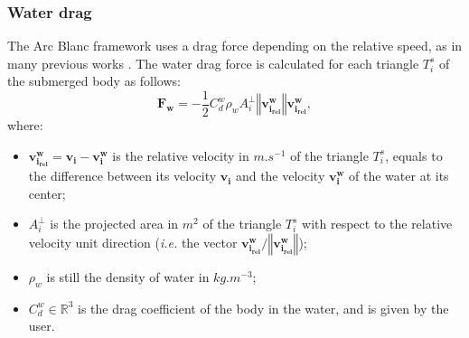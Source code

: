 \documentclass[final]{jcgt}
\def\Framework{The Arc Blanc framework\xspace}
\def\ie{\emph{i.e.}\xspace}
\begin{document}
\subsubsection{Water drag}
\label{subsubsec:waterDrag}
\Framework uses a drag force depending on the relative speed, as in many previous works \cite{yukselRealtimeWaterWaves2010,kellomakiRigidBodyInteraction2014,kernerWaterInteractionModel2016}.
The water drag force is calculated for each triangle $T_i^s$ of the submerged body as follows:
\begin{equation}
	\mathbf{F_w}= -\frac{1}{2} C_d^w \rho_w A_i^{\perp} \left\Vert\mathbf{v_{i_{rel}}^w}\right\Vert\mathbf{v_{i_{rel}}^w},
\end{equation}
where:
\begin{itemize}
	\item $\mathbf{v_{i_{rel}}^w}=\mathbf{v_i}-\mathbf{v_i^w}$ is the relative velocity in $m.s^{-1}$ of the triangle $T_i^s$, equals to the difference between its velocity $\mathbf{v_i}$ and the velocity $\mathbf{v_{i}^w}$ of the water at its center;
	\item $A_i^{\perp}$ is the projected area in $m^2$ of the triangle $T_i^s$ with respect to the relative velocity unit direction (\ie the vector $\mathbf{v_{i_{rel}}^w}/\left\Vert\mathbf{v_{i_{rel}}^w}\right\Vert$);
	\item $\rho_w$ is still the density of water in $kg.m^{-3}$;
	\item $C_d^w\in\mathbb{R}^3$ is the drag coefficient of the body in the water, and is given by the user.
\end{itemize}

\end{document}
